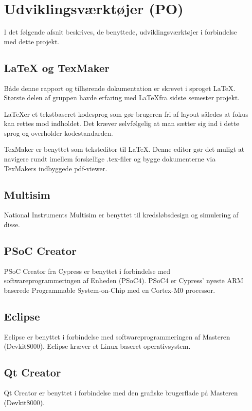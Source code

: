 
\chapter{Udviklingsværktøjer (PO)} \label{head:udviklingsvaektoejer}
I det følgende afsnit beskrives, de benyttede, udviklingsværktøjer i forbindelse med dette projekt. 

\section{LaTeX og TexMaker}
Både denne rapport og tilhørende dokumentation er skrevet i sproget \LaTeX. Største delen af gruppen havde erfaring med \LaTeX fra sidste semester projekt. 

\LaTeX er et tekstbaseret kodesprog som gør brugeren fri af layout således at fokus kan rettes mod indholdet. Det kræver selvfølgelig at man sætter sig ind i dette sprog og overholder kodestandarden. 

TexMaker er benyttet som teksteditor til \LaTeX. Denne editor gør det muligt at navigere rundt imellem forskellige .tex-filer og bygge dokumenterne via TexMakers indbyggede pdf-viewer.

\section{Multisim}
National Instruments Multisim er benyttet til kredsløbsdesign og simulering af disse. 

\section{PSoC Creator}
PSoC Creator fra Cypress er benyttet i forbindelse med softwareprogrammeringen af Enheden (PSoC4). PSoC4 er Cypress' nyeste ARM baserede Programmable System-on-Chip med en Cortex-M0 processor. 

\section{Eclipse}
Eclipse er benyttet i forbindelse med softwareprogrammeringen af Masteren (Devkit8000). Eclipse kræver et Linux baseret operativsystem.

\section{Qt Creator}
Qt Creator er benyttet i forbindelse med den grafiske brugerflade på Masteren (Devkit8000).

